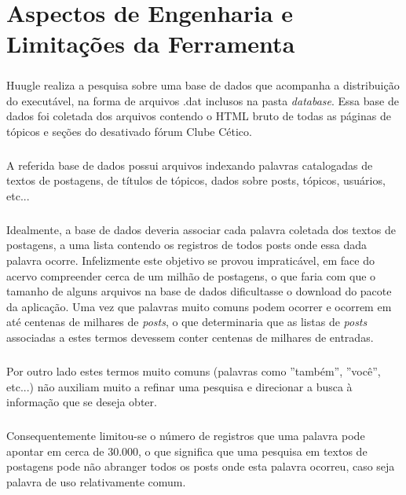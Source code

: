 \documentclass[a4paper,12pt,openany]{book}
\begin{document}
\chapter{Aspectos de Engenharia e Limitações da Ferramenta}

\paragraph{}
Huugle realiza a pesquisa sobre uma base de dados que acompanha a distribuição do executável, na forma de arquivos .dat inclusos na pasta \textit{database}. Essa base de dados foi coletada dos arquivos contendo o HTML
bruto de todas as páginas de tópicos e seções do desativado fórum Clube Cético.
\paragraph{}
A referida base de dados possui arquivos indexando palavras catalogadas de textos de postagens, de títulos de tópicos, dados sobre posts, tópicos, usuários, etc...
\paragraph{}
Idealmente, a base de dados deveria associar cada palavra coletada dos textos de postagens, a uma lista contendo os registros de todos posts onde essa dada palavra ocorre. Infelizmente este objetivo se provou impraticável, em face do acervo compreender cerca de um milhão de postagens, o que faria com que o tamanho de alguns arquivos na base de dados dificultasse o download do pacote da aplicação. Uma vez que palavras muito comuns podem ocorrer e ocorrem em até centenas
de milhares de \textit{posts}, o que determinaria que as listas de \textit{posts} associadas a estes termos devessem conter
centenas de milhares de entradas.
\paragraph{}
Por outro lado estes termos muito comuns (palavras como ”também”, ”você”, etc...) não auxiliam muito a refinar uma pesquisa e direcionar a busca à informação que se deseja obter.
\paragraph{}
Consequentemente limitou-se o número de registros que uma palavra pode apontar em cerca de 30.000, o que significa que uma pesquisa em textos de postagens pode não abranger todos os posts onde esta palavra ocorreu, caso seja palavra de uso relativamente comum.
\end{document}
